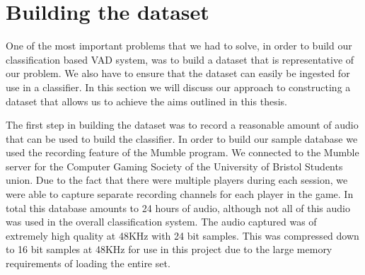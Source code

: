 \documentclass[ %
                    author={Sam Phippen},
                supervisor={Dr. Rafal Bogacz},
                     title={Real time voice activity detectors in noisy personal computing environments},
                  subtitle={},
                    degree={MEng},
                      year={2012} ]{thesis}
\begin{document}
%
%
%

\section{Building the dataset}

One of the most important problems that we had to solve, in order to build our
classification based VAD system, was to build a dataset that is representative
of our problem. We also have to ensure that the dataset can easily be ingested
for use in a classifier. In this section we will discuss our approach to
constructing a dataset that allows us to achieve the aims outlined in this
thesis.

The first step in building the dataset was to record a reasonable amount of
audio that can be used to build the classifier. In order to build our sample
database we used the recording feature of the Mumble\cite{mumble} program. We
connected to the Mumble server for the Computer Gaming Society of the University of
Bristol Students union. Due to the fact that there were multiple players during
each session, we were able to capture separate recording channels for each
player in the game. In total this database amounts to 24 hours of audio,
although not all of this audio was used in the overall classification system.
The audio captured was of extremely high quality at 48KHz with 24 bit samples.
This was compressed down to 16 bit samples at 48KHz for use in this project due
to the large memory requirements of loading the entire set.
\end{document}
